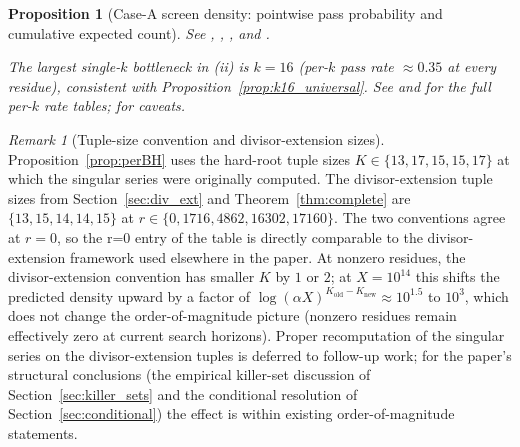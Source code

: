 \documentclass[11pt]{article}
\renewcommand{\_}{\origunderscore\allowbreak}
\newtheorem{proposition}[theorem]{Proposition}
\theoremstyle{definition}
\theoremstyle{remark}
\newtheorem{remark}[theorem]{Remark}
\begin{document}
\begin{proposition}[Case-A screen density: pointwise pass probability and cumulative expected count]
See ,
,
, and
.

The largest single-$k$ bottleneck in (ii) is $k=16$ (per-$k$ pass
rate $\approx 0.35$ at every residue), consistent with
Proposition~\ref{prop:k16_universal}.  See
 and
 for the full per-$k$
rate tables;  for caveats.
\end{proposition}

\begin{remark}[Tuple-size convention and divisor-extension sizes]\label{rem:tupleconv}
Proposition~\ref{prop:perBH} uses the hard-root tuple sizes
$K\in\{13,17,15,15,17\}$ at which the singular series were
originally computed. The divisor-extension tuple sizes from
Section~\ref{sec:div_ext} and Theorem~\ref{thm:complete} are
$\{13,15,14,14,15\}$ at $r\in\{0,1716,4862,16302,17160\}$. The two
conventions agree at $r=0$, so the r=0 entry of the table is
directly comparable to the divisor-extension framework used
elsewhere in the paper. At nonzero residues, the divisor-extension
convention has smaller $K$ by $1$ or $2$; at $X=10^{14}$ this
shifts the predicted density upward by a factor of
$\log(\alpha X)^{K_\text{old}-K_\text{new}}\approx 10^{1.5}$ to
$10^{3}$, which does not change the order-of-magnitude picture
(nonzero residues remain effectively zero at current search horizons).
Proper recomputation of the singular series on the
divisor-extension tuples is deferred to follow-up work; for the
paper's structural conclusions (the empirical killer-set
discussion of Section~\ref{sec:killer_sets} and the conditional
resolution of Section~\ref{sec:conditional}) the effect is
within existing order-of-magnitude statements.
\end{remark}
\end{document}
